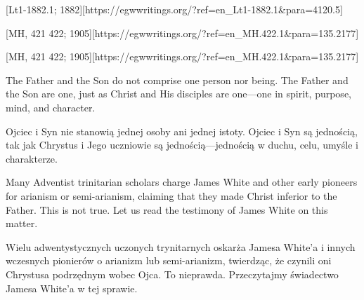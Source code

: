 [Lt1-1882.1; 1882][https://egwwritings.org/?ref=en\_Lt1-1882.1&para=4120.5]


[MH, 421 422; 1905][https://egwwritings.org/?ref=en\_MH.422.1&para=135.2177]


[MH, 421 422; 1905][https://egwwritings.org/?ref=en\_MH.422.1&para=135.2177]


The Father and the Son do not comprise one person nor being. The Father and the Son are one, just as Christ and His disciples are one—one in spirit, purpose, mind, and character.


Ojciec i Syn nie stanowią jednej osoby ani jednej istoty. Ojciec i Syn są jednością, tak jak Chrystus i Jego uczniowie są jednością—jednością w duchu, celu, umyśle i charakterze.


Many Adventist trinitarian scholars charge James White and other early pioneers for arianism or semi-arianism, claiming that they made Christ inferior to the Father. This is not true. Let us read the testimony of James White on this matter.


Wielu adwentystycznych uczonych trynitarnych oskarża Jamesa White'a i innych wczesnych pionierów o arianizm lub semi-arianizm, twierdząc, że czynili oni Chrystusa podrzędnym wobec Ojca. To nieprawda. Przeczytajmy świadectwo Jamesa White'a w tej sprawie.




